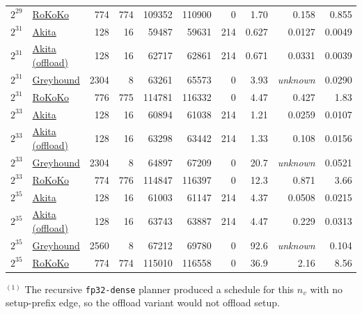 \begin{table}[H]
\begin{tabular}{@{}llrrrrrrrr@{}}
$2^{29}$ & \href{https://github.com/lattice-arguments/rokoko/commit/5caba472334f7764645ea2c7c5d612353a670121}{RoKoKo} & 774 & 774 & 109352 & 110900 & 0 & 1.70 & 0.158 & 0.855 \\
\addlinespace
$2^{31}$ & \href{https://github.com/LayerZero-Labs/akita/commit/12d486b0bca2814956d480aa121130e2702f8612}{Akita} & 128 & 16 & 59487 & 59631 & 214 & 0.627 & 0.0127 & 0.0049 \\
$2^{31}$ & \href{https://github.com/LayerZero-Labs/akita/commit/12d486b0bca2814956d480aa121130e2702f8612}{Akita (offload)} & 128 & 16 & 62717 & 62861 & 214 & 0.671 & 0.0331 & 0.0039 \\
$2^{31}$ & \href{https://github.com/LayerZero-Labs/greyhound-reference/commit/672e74100496f6ef698ba35e241cf7593e3d57af}{Greyhound} & 2304 & 8 & 63261 & 65573 & 0 & 3.93 & \textit{unknown} & 0.0290 \\
$2^{31}$ & \href{https://github.com/lattice-arguments/rokoko/commit/5caba472334f7764645ea2c7c5d612353a670121}{RoKoKo} & 776 & 775 & 114781 & 116332 & 0 & 4.47 & 0.427 & 1.83 \\
\addlinespace
$2^{33}$ & \href{https://github.com/LayerZero-Labs/akita/commit/12d486b0bca2814956d480aa121130e2702f8612}{Akita} & 128 & 16 & 60894 & 61038 & 214 & 1.21 & 0.0259 & 0.0107 \\
$2^{33}$ & \href{https://github.com/LayerZero-Labs/akita/commit/12d486b0bca2814956d480aa121130e2702f8612}{Akita (offload)} & 128 & 16 & 63298 & 63442 & 214 & 1.33 & 0.108 & 0.0156 \\
$2^{33}$ & \href{https://github.com/LayerZero-Labs/greyhound-reference/commit/672e74100496f6ef698ba35e241cf7593e3d57af}{Greyhound} & 2304 & 8 & 64897 & 67209 & 0 & 20.7 & \textit{unknown} & 0.0521 \\
$2^{33}$ & \href{https://github.com/lattice-arguments/rokoko/commit/5caba472334f7764645ea2c7c5d612353a670121}{RoKoKo} & 774 & 776 & 114847 & 116397 & 0 & 12.3 & 0.871 & 3.66 \\
\addlinespace
$2^{35}$ & \href{https://github.com/LayerZero-Labs/akita/commit/12d486b0bca2814956d480aa121130e2702f8612}{Akita} & 128 & 16 & 61003 & 61147 & 214 & 4.37 & 0.0508 & 0.0215 \\
$2^{35}$ & \href{https://github.com/LayerZero-Labs/akita/commit/12d486b0bca2814956d480aa121130e2702f8612}{Akita (offload)} & 128 & 16 & 63743 & 63887 & 214 & 4.47 & 0.229 & 0.0313 \\
$2^{35}$ & \href{https://github.com/LayerZero-Labs/greyhound-reference/commit/672e74100496f6ef698ba35e241cf7593e3d57af}{Greyhound} & 2560 & 8 & 67212 & 69780 & 0 & 92.6 & \textit{unknown} & 0.104 \\
$2^{35}$ & \href{https://github.com/lattice-arguments/rokoko/commit/5caba472334f7764645ea2c7c5d612353a670121}{RoKoKo} & 774 & 774 & 115010 & 116558 & 0 & 36.9 & 2.16 & 8.56 \\
\bottomrule
\end{tabular}
\smallskip
{\footnotesize
\noindent$^{(1)}$ The recursive \texttt{fp32-dense} planner produced a schedule for this $n_v$ with no setup-prefix edge, so the offload variant would not offload setup.\\
}
\end{table}


